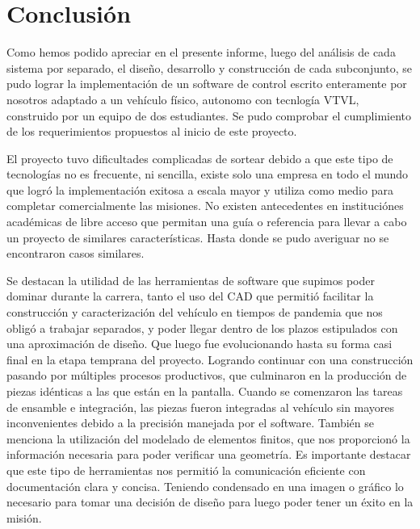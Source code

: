 \section{Conclusión}\label{sec:conclusion}

Como hemos podido apreciar en el presente informe, luego del análisis de cada sistema por separado, el diseño, desarrollo y construcción de cada subconjunto, se pudo lograr la implementación de un software de control escrito enteramente por nosotros adaptado a un vehículo físico, autonomo con tecnlogía VTVL, construido por un equipo de dos estudiantes. Se pudo comprobar el cumplimiento de los requerimientos propuestos al inicio de este proyecto.


\medskip

El proyecto tuvo dificultades complicadas de sortear debido a que este tipo de tecnologías no es frecuente, ni sencilla, existe solo una empresa en todo el mundo que logró la implementación exitosa a escala mayor y utiliza como medio para completar comercialmente las misiones. No existen antecedentes en instituciónes académicas de libre acceso que permitan una guía o referencia para llevar a cabo un proyecto de similares características. Hasta donde se pudo averiguar no se encontraron casos similares.


Se destacan la utilidad de las herramientas de software que supimos poder dominar durante la carrera, tanto el uso del CAD que permitió facilitar la construcción y caracterización del vehículo en tiempos de pandemia que nos obligó a trabajar separados, y poder llegar dentro de los plazos estipulados con una aproximación de diseño. Que luego fue evolucionando hasta su forma casi final en la etapa temprana del proyecto. Logrando continuar con una construcción pasando por múltiples procesos productivos, que culminaron en la producción de piezas idénticas a las que están en la pantalla. Cuando se comenzaron las tareas de ensamble e integración, las piezas fueron integradas al vehículo sin mayores inconvenientes debido a la precisión manejada por el software. También se menciona la utilización del modelado de elementos finitos, que nos proporcionó la información necesaria para poder verificar una geometría. Es importante destacar que este tipo de herramientas nos permitió la comunicación eficiente con documentación clara y concisa. Teniendo condensado en una imagen o gráfico lo necesario para tomar una decisión de diseño para luego poder tener un éxito en la misión.

